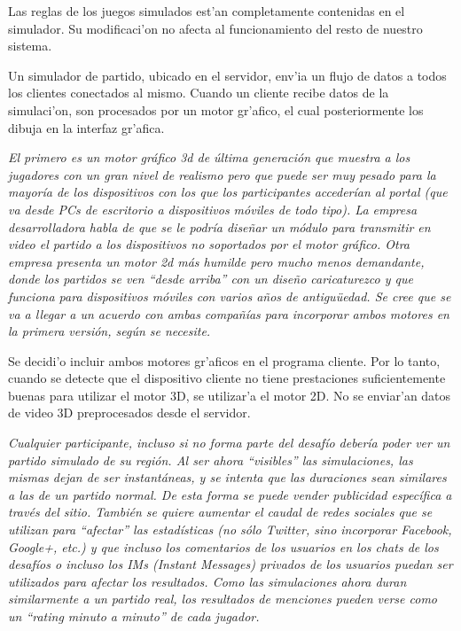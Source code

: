 Las reglas de los juegos simulados est'an completamente contenidas en el simulador. Su modificaci'on no afecta al funcionamiento del resto de nuestro sistema.

Un simulador de partido, ubicado en el servidor, env'ia un flujo de datos a todos los clientes conectados al mismo. Cuando un cliente recibe datos de la simulaci'on, son procesados por un motor gr'afico, el cual posteriormente los dibuja en la interfaz gr'afica.

\textit{
El primero es un motor gráfico 3d de última generación que muestra a los jugadores con un gran nivel de realismo pero que puede ser muy pesado para la mayoría de los dispositivos con los que los participantes accederían al portal (que va desde PCs de escritorio a dispositivos móviles de todo tipo). La empresa desarrolladora habla de que se le podría diseñar un módulo para transmitir en video el partido a los dispositivos no soportados por el motor gráfico. Otra empresa presenta un motor 2d más humilde pero mucho menos demandante, donde los partidos se ven “desde arriba” con un diseño caricaturezco y que funciona para dispositivos móviles con varios años de antigu\"uedad. Se cree que se va a llegar a un acuerdo con ambas compañías para incorporar ambos motores en la primera versión, según se necesite.
}

Se decidi'o incluir ambos motores gr'aficos en el programa cliente. Por lo tanto, cuando se detecte que el dispositivo cliente no tiene prestaciones suficientemente buenas para utilizar el motor 3D, se utilizar'a el motor 2D. No se enviar'an datos de video 3D preprocesados desde el servidor.

\textit{
Cualquier participante, incluso si no forma parte del desafío debería poder ver un partido simulado de su región. Al ser ahora “visibles” las simulaciones, las mismas dejan de ser instantáneas, y se intenta que las duraciones sean similares a las de un partido normal. De esta forma se puede vender publicidad específica a través del sitio. También se quiere aumentar el caudal de redes sociales que se utilizan para “afectar” las estadísticas (no sólo Twitter, sino incorporar Facebook, Google+, etc.) y que incluso los comentarios de los usuarios en los chats de los desafíos o incluso los IMs (Instant Messages) privados de los usuarios puedan ser utilizados para afectar los resultados. Como las simulaciones ahora duran similarmente a un partido real, los resultados de menciones pueden verse como un “rating minuto a minuto” de cada jugador.
}


